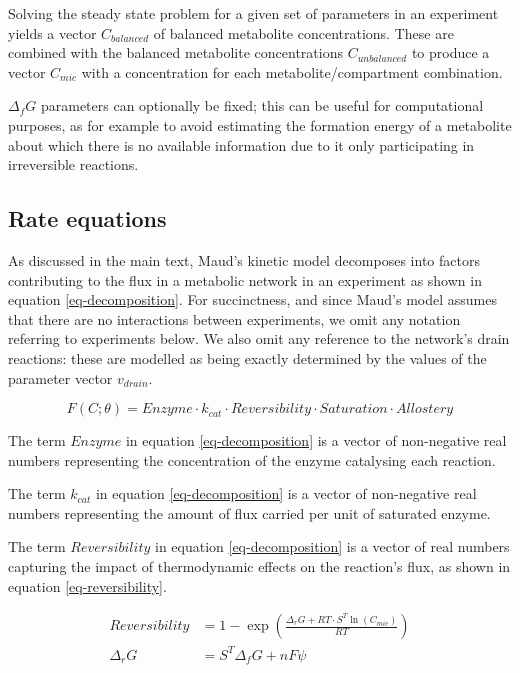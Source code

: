 \documentclass[journal=asbcd6,manuscript=article,layout=traditional]{achemso}
\begin{document}
Solving the steady state problem for a given set of parameters in an
experiment yields a vector \(C_{balanced}\) of balanced metabolite
concentrations. These are combined with the balanced metabolite
concentrations \(C_{unbalanced}\) to produce a vector \(C_{mic}\) with a
concentration for each metabolite/compartment combination.

\(\Delta_fG\) parameters can optionally be fixed; this can be useful for
computational purposes, as for example to avoid estimating the formation
energy of a metabolite about which there is no available information due
to it only participating in irreversible reactions.

\subsection{Rate equations}\label{rate-equations}

As discussed in the main text, Maud's kinetic model decomposes into
factors contributing to the flux in a metabolic network in an experiment
as shown in equation \eqref{eq-decomposition}. For succinctness, and
since Maud's model assumes that there are no interactions between
experiments, we omit any notation referring to experiments below. We
also omit any reference to the network's drain reactions: these are
modelled as being exactly determined by the values of the parameter
vector \(v_{drain}\).

\begin{equation}
F(C;\theta) = Enzyme\cdot k_{cat}\cdot Reversibility \cdot Saturation \cdot Allostery \label{eq-decomposition}
\end{equation}

The term \(Enzyme\) in equation \eqref{eq-decomposition} is a vector of
non-negative real numbers representing the concentration of the enzyme
catalysing each reaction.

The term \(k_{cat}\) in equation \eqref{eq-decomposition} is a vector of
non-negative real numbers representing the amount of flux carried per
unit of saturated enzyme.

The term \(Reversibility\) in equation \eqref{eq-decomposition} is a
vector of real numbers capturing the impact of thermodynamic effects on
the reaction's flux, as shown in equation \eqref{eq-reversibility}.

\begin{align} 
  Reversibility &= 1 - \exp(\frac{\Delta_{r}G + RT \cdot S^T \ln(C_{mic})}{RT}) \label{eq-reversibility} \\ 
  \Delta_{r}G &= S^{T}\Delta_{f}G + n F \psi \nonumber 
\end{align}
\end{document}
